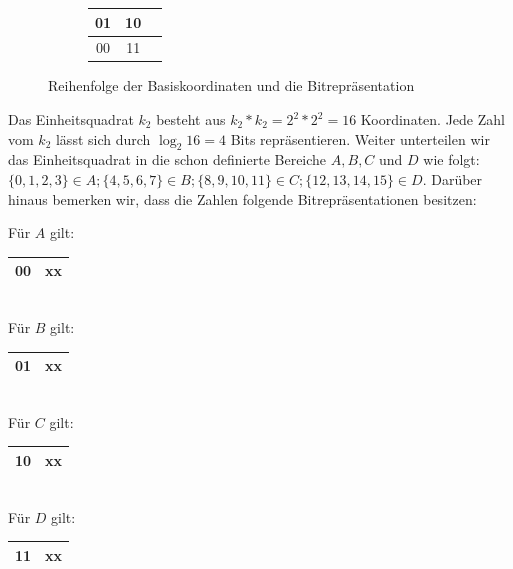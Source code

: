 \documentclass[course=erap]{aspdoc}
\begin{document}
\begin{figure}[H]
\begin{subfigure}{.5\textwidth}
\end{subfigure}%
\begin{subfigure}{.5\textwidth}
\centering
{}
\end{subfigure}%
\begin{subfigure}{.5\textwidth}
  \centering
\begin{table}[H]
\begin{tabular}{|c| c| c|}
\hline
01 &  10 \\ 
\hline
00 & 11\\
\hline
\end{tabular}
\end{table}
\end{subfigure}%
  \caption{Reihenfolge der Basiskoordinaten und die Bitrepräsentation}
\end{figure}

Das Einheitsquadrat $k_{2}$ besteht aus $k_{2}*k_{2}=2^2*2^2=16$ Koordinaten.
Jede Zahl vom $k_{2}$ lässt sich durch $\log_2 16=4$ Bits repräsentieren.
Weiter unterteilen wir das Einheitsquadrat in die schon definierte Bereiche $A,
B, C$ und $D$ wie folgt: $\{0,1,2,3\}\in A; \{4,5,6,7\}\in B; \{8,9,10,11\}\in
C; \{12,13,14,15\}\in D$. Darüber hinaus bemerken wir, dass die Zahlen folgende
Bitrepräsentationen besitzen:

Für $A$ gilt: 
\begin{tabular}{|c| c|}
\hline
00 &  xx \\ 
\hline
\end{tabular}\\
Für $B$ gilt: 
\begin{tabular}{|c| c|}
\hline
01 &  xx \\ 
\hline
\end{tabular}\\
Für $C$ gilt: 
\begin{tabular}{|c| c|}
\hline
10 &  xx \\ 
\hline
\end{tabular}\\
Für $D$ gilt: 
\begin{tabular}{|c| c|}
\hline
11 &  xx \\ 
\hline
\end{tabular}
\end{document}
